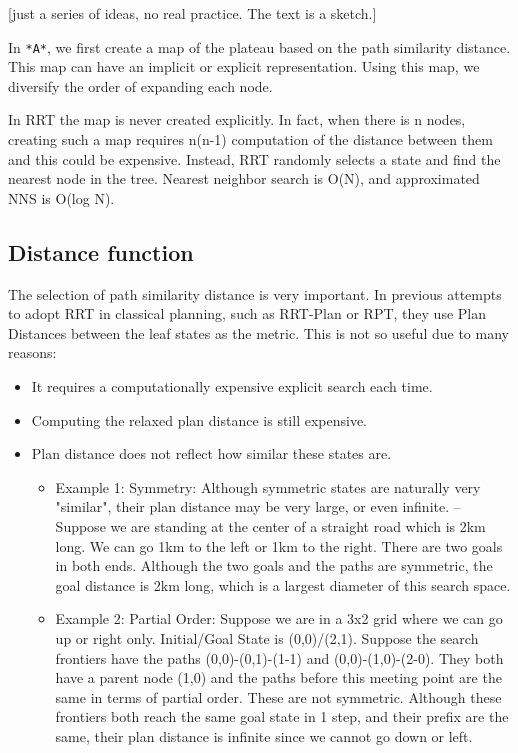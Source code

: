 [just a series of ideas, no real practice. The text is a sketch.]

In \texttt{*A*}, we first create a map of the plateau based on the path similarity
distance. This map can have an implicit or explicit representation.
Using this map, we diversify the order of expanding each node.

In RRT the map is never created explicitly.
In fact, when there is n nodes, creating such a map requires n(n-1) computation of the distance
between them and this could be expensive. Instead, RRT randomly selects a state
and find the nearest node in the tree. Nearest neighbor search is O(N), and
approximated NNS is O(log N).

\subsection{Distance function}
\label{sec-2-1}

The selection of path similarity distance is very important.
In previous attempts to adopt RRT in classical planning, such as
RRT-Plan or RPT, they use Plan Distances between the leaf states as the
metric. This is not so useful due to many reasons:

\begin{itemize}
\item It requires a computationally expensive explicit search each time.
\item Computing the relaxed plan distance is still expensive.
\item Plan distance does not reflect how similar these states are.
\begin{itemize}
\item Example 1: Symmetry: Although symmetric states are naturally very
"similar", their plan distance may be very large, or even
infinite. -- Suppose we are standing at the center of a straight
road which is 2km long. We can go 1km to the left or 1km to the
right. There are two goals in both ends. Although the two goals and the
paths are symmetric, the goal distance is 2km long, which is a largest
diameter of this search space.
\item Example 2: Partial Order: Suppose we are in a 3x2 grid where we can go
up or right only. Initial/Goal State is (0,0)/(2,1). Suppose the search
frontiers have the paths (0,0)-(0,1)-(1-1) and (0,0)-(1,0)-(2-0).
They both have a parent node
(1,0) and the paths before this meeting point are the same in terms of
partial order. These are not symmetric. Although these frontiers both reach
the same goal state in 1 step, and their prefix are the same, their
plan distance is infinite since we cannot go down or left.
\end{itemize}
\end{itemize}

